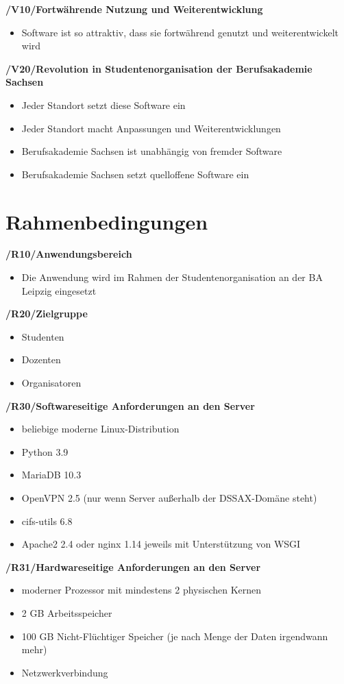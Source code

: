 \documentclass[12pt, a4paper]{scrartcl}
\newcommand{\ford}[2]{\textbf{/#1/\hspace{2em}#2}}
\begin{document}
\ford{V10}{Fortwährende Nutzung und Weiterentwicklung}
\begin{itemize}
	\item Software ist so attraktiv, dass sie fortwährend genutzt und weiterentwickelt wird
\end{itemize}

\ford{V20}{Revolution in Studentenorganisation der Berufsakademie Sachsen}
\begin{itemize}
	\item Jeder Standort setzt diese Software ein
	\item Jeder Standort macht Anpassungen und Weiterentwicklungen
	\item Berufsakademie Sachsen ist unabhängig von fremder Software
	\item Berufsakademie Sachsen setzt quelloffene Software ein
\end{itemize}
\newpage

\section{Rahmenbedingungen}
\ford{R10}{Anwendungsbereich}
\begin{itemize}
	\item Die Anwendung wird im Rahmen der Studentenorganisation an der BA Leipzig eingesetzt
\end{itemize}

\ford{R20}{Zielgruppe}
\begin{itemize}
	\item Studenten
	\item Dozenten
	\item Organisatoren
\end{itemize}

\ford{R30}{Softwareseitige Anforderungen an den Server}
\begin{itemize}
	\item beliebige moderne Linux-Distribution
	\item Python 3.9
	\item MariaDB 10.3
	\item OpenVPN 2.5 (nur wenn Server außerhalb der DSSAX-Domäne steht)
	\item cifs-utils 6.8
	\item Apache2 2.4 oder nginx 1.14 jeweils mit Unterstützung von WSGI
\end{itemize}

\ford{R31}{Hardwareseitige Anforderungen an den Server}
\begin{itemize}
	\item moderner Prozessor mit mindestens 2 physischen Kernen
	\item 2 GB Arbeitsspeicher
	\item 100 GB Nicht-Flüchtiger Speicher (je nach Menge der Daten irgendwann mehr)
	\item Netzwerkverbindung
\end{itemize}
\end{document}
